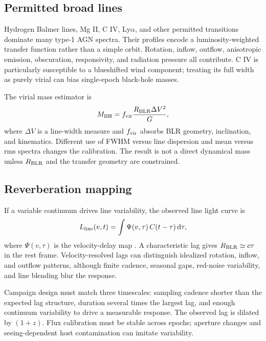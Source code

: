\subsection{Permitted broad lines}

Hydrogen Balmer lines, Mg II, C IV, Ly$\alpha$, and other permitted
transitions dominate many type-1 AGN spectra. Their profiles encode a
luminosity-weighted transfer function rather than a simple orbit. Rotation,
inflow, outflow, anisotropic emission, obscuration, responsivity, and
radiation pressure all contribute. C IV is particularly susceptible to a
blueshifted wind component; treating its full width as purely virial can bias
single-epoch black-hole masses.

The virial mass estimator is
\begin{equation}
 M_{\rm BH}=f_{\rm vir}\frac{R_{\rm BLR}\Delta V^2}{G},
 \label{eq:virial-mass}
\end{equation}
where $\Delta V$ is a line-width measure and $f_{\rm vir}$ absorbs BLR
geometry, inclination, and kinematics. Different use of FWHM versus line
dispersion and mean versus rms spectra changes the calibration. The result is
not a direct dynamical mass unless $R_{\rm BLR}$ and the transfer geometry are
constrained.

\subsection{Reverberation mapping}

If a variable continuum drives line variability, the observed line light
curve is
\begin{equation}
 L_{\rm line}(v,t)=
 \int \Psi(v,\tau)\,C(t-\tau)\,{\rm d}\tau,
 \label{eq:reverberation}
\end{equation}
where $\Psi(v,\tau)$ is the velocity-delay map
\citep{BlandfordMcKee1982,Peterson1993}. A characteristic lag gives
$R_{\rm BLR}\simeq c\tau$ in the rest frame. Velocity-resolved lags can
distinguish idealized rotation, inflow, and outflow patterns, although finite
cadence, seasonal gaps, red-noise variability, and line blending blur the
response.

Campaign design must match three timescales: sampling cadence shorter than the
expected lag structure, duration several times the largest lag, and enough
continuum variability to drive a measurable response. The observed lag is
dilated by $(1+z)$. Flux calibration must be stable across epochs; aperture
changes and seeing-dependent host contamination can imitate variability.

